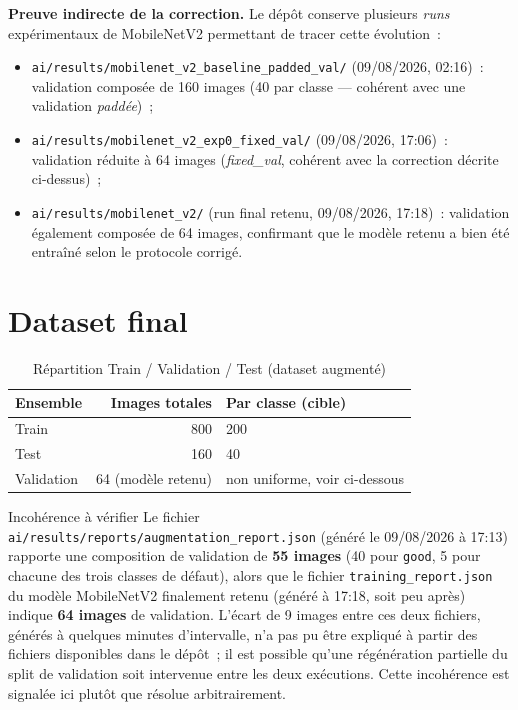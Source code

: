 \textbf{Preuve indirecte de la correction.} Le d\'ep\^ot conserve plusieurs \emph{runs} exp\'erimentaux de MobileNetV2 permettant de tracer cette \'evolution~:
\begin{itemize}
  \item \texttt{ai/results/mobilenet\_v2\_baseline\_padded\_val/} (09/08/2026, 02:16)~: validation compos\'ee de 160 images (40 par classe --- coh\'erent avec une validation \emph{padd\'ee})~;
  \item \texttt{ai/results/mobilenet\_v2\_exp0\_fixed\_val/} (09/08/2026, 17:06)~: validation r\'eduite \`a 64 images (\emph{fixed\_val}, coh\'erent avec la correction d\'ecrite ci-dessus)~;
  \item \texttt{ai/results/mobilenet\_v2/} (run final retenu, 09/08/2026, 17:18)~: validation \'egalement compos\'ee de 64 images, confirmant que le mod\`ele retenu a bien \'et\'e entra\^in\'e selon le protocole corrig\'e.
\end{itemize}

\section{Dataset final}

\begin{table}[H]
\centering
\caption{R\'epartition Train / Validation / Test (dataset augment\'e)}
\label{tab:dataset-final}
\begin{tabular}{lrl}
\toprule
Ensemble & Images totales & Par classe (cible) \\
\midrule
Train & 800 & 200 \\
Test & 160 & 40 \\
Validation & 64 (mod\`ele retenu) & non uniforme, voir ci-dessous \\
\bottomrule
\end{tabular}
\end{table}

\begin{noteflag}{Incoh\'erence \`a v\'erifier}
Le fichier \texttt{ai/results/reports/augmentation\_report.json} (g\'en\'er\'e le 09/08/2026 \`a 17:13) rapporte une composition de validation de \textbf{55 images} (40 pour \texttt{good}, 5 pour chacune des trois classes de d\'efaut), alors que le fichier \texttt{training\_report.json} du mod\`ele MobileNetV2 finalement retenu (g\'en\'er\'e \`a 17:18, soit peu apr\`es) indique \textbf{64 images} de validation. L'\'ecart de 9 images entre ces deux fichiers, g\'en\'er\'es \`a quelques minutes d'intervalle, n'a pas pu \^etre expliqu\'e \`a partir des fichiers disponibles dans le d\'ep\^ot~; il est possible qu'une r\'eg\'en\'eration partielle du split de validation soit intervenue entre les deux ex\'ecutions. Cette incoh\'erence est signal\'ee ici plut\^ot que r\'esolue arbitrairement.
\end{noteflag}

